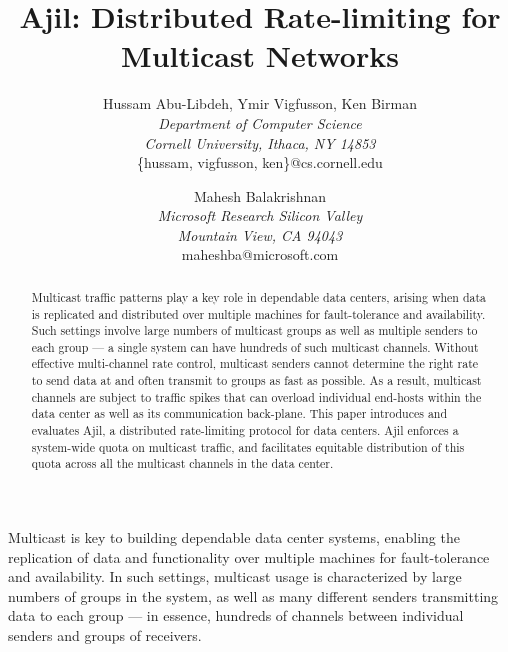 \documentclass[times, 10pt,twocolumn]{article}
\begin{document}
\title{Ajil: Distributed Rate-limiting for Multicast Networks}

\author{Hussam Abu-Libdeh, Ymir Vigfusson, Ken Birman\\
\textit{Department of Computer Science}\\
\textit{Cornell University, Ithaca, NY 14853}\\
\{hussam, vigfusson, ken\}@cs.cornell.edu\\
\and
Mahesh Balakrishnan\\
\textit{Microsoft Research Silicon Valley}\\
\textit{Mountain View, CA 94043}\\
maheshba@microsoft.com\\
}

\maketitle
\thispagestyle{empty}

\begin{abstract}
Multicast traffic patterns play a key role in dependable data centers, arising when data is replicated and distributed over multiple machines for fault-tolerance and availability. Such settings involve large numbers of multicast groups as well as multiple senders to each group --- a single system can have hundreds of such multicast channels. Without effective multi-channel rate control, multicast senders cannot determine the right rate to send data at and often transmit to groups as fast as possible. As a result, multicast channels are subject to traffic spikes that can overload individual end-hosts within the data center as well as its communication back-plane. This paper introduces and evaluates Ajil, a distributed rate-limiting protocol for data centers. Ajil enforces a system-wide quota on multicast traffic, and facilitates equitable distribution of this quota across all the multicast channels in the data center.
\end{abstract}




Multicast is key to building dependable data center systems, enabling the replication of data and functionality over multiple machines for fault-tolerance and availability. In such settings, multicast usage is characterized by large numbers of groups in the system, as well as many different senders transmitting data to each group --- in essence, hundreds of channels between individual senders and groups of receivers.
\end{document}
